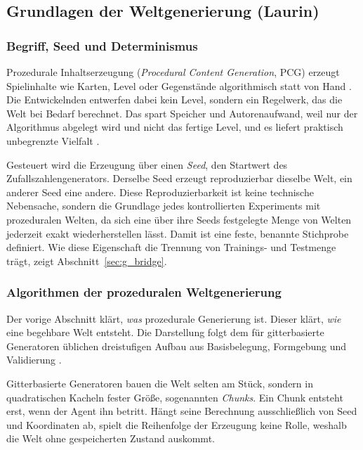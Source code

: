 \documentclass[11pt,a4paper]{article}
\begin{document}
\subsection{Grundlagen der Weltgenerierung (Laurin)}
\label{sec:g_pcg}

\subsubsection{Begriff, Seed und Determinismus}
\label{sec:pcg_generalisierung}

Prozedurale Inhaltserzeugung (\emph{Procedural Content Generation}, PCG) erzeugt
Spielinhalte wie Karten, Level oder Gegenstände algorithmisch statt von Hand
\cite{shaker2016pcg, togelius2011search}. Die Entwickelnden entwerfen dabei kein
Level, sondern ein Regelwerk, das die Welt bei Bedarf berechnet. Das spart
Speicher und Autorenaufwand, weil nur der Algorithmus abgelegt wird und nicht
das fertige Level, und es liefert praktisch unbegrenzte Vielfalt
\cite{shaker2016pcg}.

Gesteuert wird die Erzeugung über einen \emph{Seed}, den Startwert des
Zufallszahlengenerators. Derselbe Seed erzeugt reproduzierbar dieselbe Welt, ein
anderer Seed eine andere. Diese Reproduzierbarkeit ist keine technische
Nebensache, sondern die Grundlage jedes kontrollierten Experiments mit
prozeduralen Welten, da sich eine über ihre Seeds festgelegte Menge von Welten
jederzeit exakt wiederherstellen lässt. Damit ist eine feste, benannte
Stichprobe definiert. Wie diese Eigenschaft die Trennung von Trainings- und
Testmenge trägt, zeigt Abschnitt~\ref{sec:g_bridge}.

\subsubsection{Algorithmen der prozeduralen Weltgenerierung}
\label{sec:pcg_algorithmen}

Der vorige Abschnitt klärt, \emph{was} prozedurale Generierung ist. Dieser
klärt, \emph{wie} eine begehbare Welt entsteht. Die Darstellung folgt dem für
gitterbasierte Generatoren üblichen dreistufigen Aufbau aus Basisbelegung,
Formgebung und Validierung \cite{shaker2016pcg}.

Gitterbasierte Generatoren bauen die Welt selten am Stück, sondern in
quadratischen Kacheln fester Größe, sogenannten \emph{Chunks}. Ein Chunk
entsteht erst, wenn der Agent ihn betritt. Hängt seine Berechnung ausschließlich
von Seed und Koordinaten ab, spielt die Reihenfolge der Erzeugung keine Rolle,
weshalb die Welt ohne gespeicherten Zustand auskommt.
\end{document}

